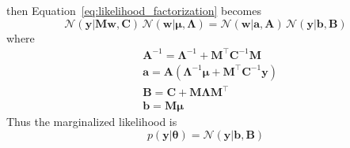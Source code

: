 \documentclass[12pt,dvipsnames]{report}
\renewcommand{\vec}[1]{\boldsymbol{\mathbf{#1}}}
\begin{document}
then Equation~\ref{eq:likelihood_factorization} becomes
\citep[for the proof see][]{arXiv:2005.14199}
\begin{equation}
    \mathcal{N}(\vec{y} \lvert \vec{M} \vec{w}, \vec{C})\, \mathcal{N}(\vec{w} \lvert\vec{\mu}, \vec{\Lambda})=\mathcal{N}(\vec{w} \lvert\vec{a}, \vec{A})\, \mathcal{N}(\vec{y} \lvert\vec{b}, \vec{B})
\end{equation}
where
\begin{align}
     & \vec{A}^{-1}   =\vec{\Lambda}^{-1}+\vec{M}^{\intercal} \vec{C}^{-1} \vec{M}                                                     \\
     & \vec{a}     =\vec{A} \left(\boldsymbol{\Lambda}^{-1} \boldsymbol{\mu}+\vec{M}^{\intercal} \mathbf{C}^{-1} \boldsymbol{y}\right) \\
     & \mathbf{B}=\mathbf{C}+\vec{M} \vec{\Lambda} \vec{M}^{\intercal}                                                                 \\
     & \vec{b}=\vec{M} \vec{\mu}
\end{align}
Thus the marginalized likelihood is
\begin{equation}
    p(\vec{y}\lvert \vec{\theta}) = \mathcal{N}(\vec{y} \lvert \vec{b}, \vec{B})
    \label{eq:likelihood_lin_params_marginalized}
\end{equation}
\end{document}
